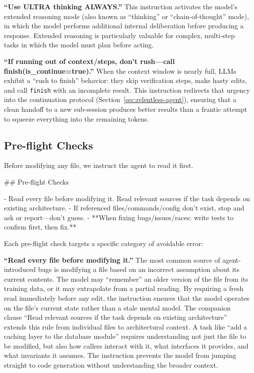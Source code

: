 \documentclass{article}
\begin{document}
\textbf{``Use ULTRA thinking ALWAYS.''}  This instruction activates the model's extended reasoning mode (also known as ``thinking'' or ``chain-of-thought'' mode), in which the model performs additional internal deliberation before producing a response.  Extended reasoning is particularly valuable for complex, multi-step tasks in which the model must plan before acting.

\textbf{``If running out of context/steps, don't rush---call finish(is\_continue=true).''}  When the context window is nearly full, LLMs exhibit a ``rush to finish'' behavior: they skip verification steps, make hasty edits, and call \texttt{finish} with an incomplete result.  This instruction redirects that urgency into the continuation protocol (Section~\ref{sec:relentless-agent}), ensuring that a clean handoff to a new sub-session produces better results than a frantic attempt to squeeze everything into the remaining tokens.

\subsection{Pre-flight Checks}

Before modifying any file, we instruct the agent to read it first.  

\begin{prompt}
## Pre-flight Checks

- Read every file before modifying it. Read relevant sources if the task depends on existing architecture.
- If referenced files/commands/config don't exist, stop and ask or report---don't guess.
- **When fixing bugs/issues/races: write tests to confirm first, then fix.**
\end{prompt}

\noindent Each pre-flight check targets a specific category of avoidable
error:

\textbf{``Read every file before modifying it.''}  The most common source of agent-introduced bugs is modifying a file based on an incorrect assumption about its current contents.  The model may ``remember'' an older version of the file from its training data, or it may extrapolate from a partial reading.  By requiring a fresh read immediately before any edit, the instruction ensures that the model operates on the file's current state rather than a stale mental model.  The companion clause ``Read relevant sources if the task depends on existing architecture'' extends this rule from individual files to architectural context.  A task like ``add a caching layer to the database module'' requires understanding not just the file to be modified, but also how callers interact with it, what interfaces it provides, and what invariants it assumes.  The instruction prevents the model from jumping straight to code generation without understanding the broader context.
\end{document}
